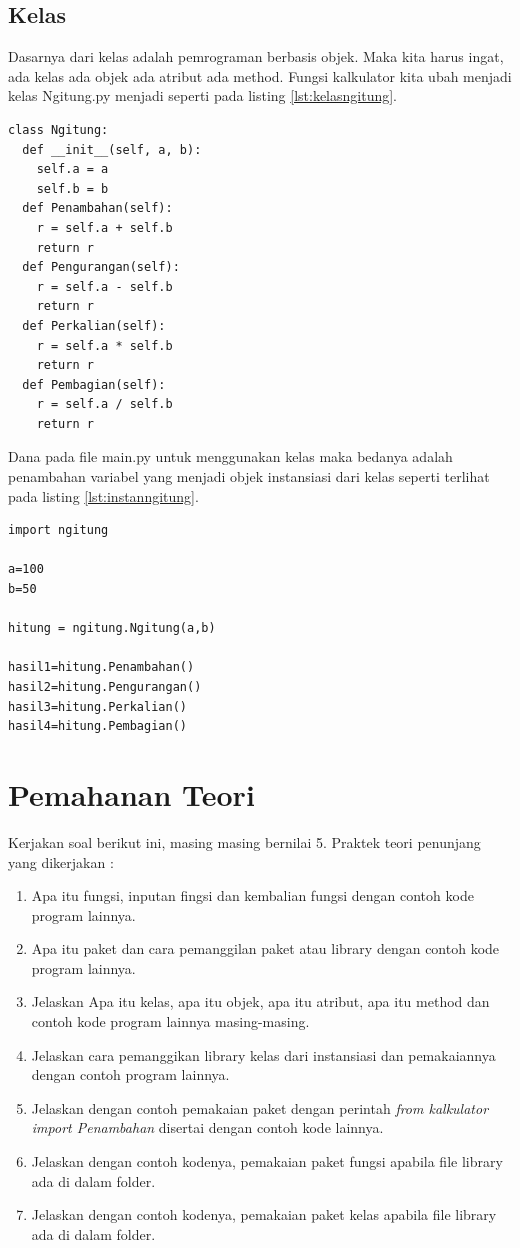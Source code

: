 \subsection{Kelas}
Dasarnya dari kelas adalah pemrograman berbasis objek. Maka kita harus ingat, ada kelas ada objek ada atribut ada method. Fungsi kalkulator kita ubah menjadi kelas Ngitung.py menjadi seperti pada listing \ref{lst:kelasngitung}.
\begin{lstlisting}[caption=Kelas library kalkulator,label={lst:kelasngitung}]
class Ngitung:
  def __init__(self, a, b):
    self.a = a
    self.b = b
  def Penambahan(self):
    r = self.a + self.b
    return r
  def Pengurangan(self):
    r = self.a - self.b
    return r
  def Perkalian(self):
    r = self.a * self.b
    return r
  def Pembagian(self):
    r = self.a / self.b
    return r
\end{lstlisting}
Dana pada file main.py untuk menggunakan kelas maka bedanya adalah penambahan variabel yang menjadi objek instansiasi dari kelas seperti terlihat pada listing \ref{lst:instanngitung}.
\begin{lstlisting}[caption=Cara penggunaan kelas library kalkulator,label={lst:instanngitung}]
import ngitung

a=100
b=50

hitung = ngitung.Ngitung(a,b)

hasil1=hitung.Penambahan()
hasil2=hitung.Pengurangan()
hasil3=hitung.Perkalian()
hasil4=hitung.Pembagian()
\end{lstlisting}



\section{Pemahanan Teori}
Kerjakan soal berikut ini, masing masing bernilai 5. 
Praktek teori penunjang yang dikerjakan :
\begin{enumerate}
\item
Apa itu fungsi, inputan fingsi dan kembalian fungsi dengan contoh kode program lainnya.
\item
Apa itu paket dan cara pemanggilan paket atau library dengan contoh kode program lainnya.
\item
Jelaskan Apa itu kelas, apa itu objek, apa itu atribut, apa itu method dan contoh kode program lainnya masing-masing.
\item
Jelaskan cara pemanggikan library kelas dari instansiasi dan pemakaiannya dengan contoh program lainnya.
\item
Jelaskan dengan contoh pemakaian paket dengan perintah \textit{from kalkulator import Penambahan} disertai dengan contoh kode lainnya.
\item
Jelaskan dengan contoh kodenya, pemakaian paket fungsi apabila file library ada di dalam folder.
\item
Jelaskan dengan contoh kodenya, pemakaian paket kelas apabila file library ada di dalam folder.
\end{enumerate}

